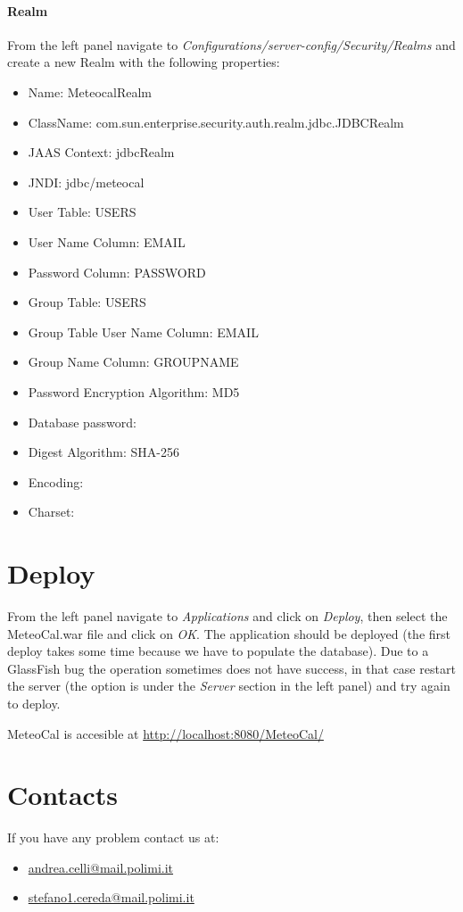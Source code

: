 \documentclass[10pt,a4paper,titlepage]{article}
\begin{document}
\subsection{Realm}
From the left panel navigate to \emph{Configurations/server-config/Security/Realms} and create a new Realm with the following properties:
\begin{itemize}
\item Name: MeteocalRealm
\item ClassName: com.sun.enterprise.security.auth.realm.jdbc.JDBCRealm
\item JAAS Context: jdbcRealm
\item JNDI: jdbc/meteocal
\item User Table: USERS
\item User Name Column: EMAIL
\item Password Column: PASSWORD
\item Group Table: USERS
\item Group Table User Name Column: EMAIL
\item Group Name Column: GROUPNAME
\item Password Encryption Algorithm: MD5
\item Database password:
\item Digest Algorithm: SHA-256
\item Encoding:
\item Charset:
\end{itemize}

\part{Deploy}
From the left panel navigate to \emph{Applications} and click on \emph{Deploy}, then select the MeteoCal.war file and click on \emph{OK}. The application should be deployed (the first deploy takes some time because we have to populate the database). Due to a GlassFish bug the operation sometimes does not have success, in that case restart the server (the option is under the \emph{Server} section in the left panel) and try again to deploy.

MeteoCal is accesible at \url{http://localhost:8080/MeteoCal/}

\part{Contacts}
If you have any problem contact us at:
\begin{itemize}
\item \url{andrea.celli@mail.polimi.it}
\item \url{stefano1.cereda@mail.polimi.it}
\end{itemize}
\end{document}
